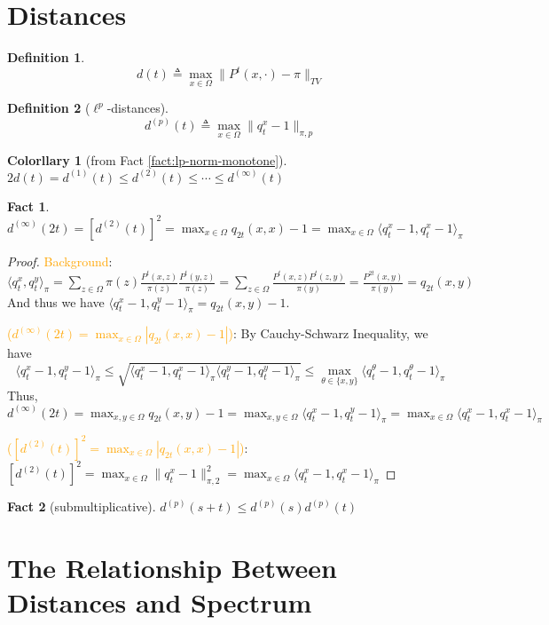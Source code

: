 \documentclass[utf8]{article}
\newtheorem{define}{Definition}[section]
\newtheorem{fact}{Fact}[section]
\newtheorem{corollary}{Colorllary}[section]
\def\<{\langle}
\def\>{\rangle}
\begin{document}
\section{Distances}
\begin{define}
  \[d(t) \triangleq \max_{x\in\Omega} \parallel P^t(x, \cdot) - \pi \parallel_{TV}\]
\end{define}
\begin{define}[$\ell^p$-distances]
  \[d^{(p)}(t) \triangleq \max_{x\in\Omega} \parallel q_t^x - 1 \parallel_{\pi, p}\]
\end{define}
\begin{corollary}[from Fact \ref{fact:lp-norm-monotone}]
  $2d(t) = d^{(1)}(t) \leq d^{(2)}(t) \leq \cdots \leq d^{(\infty)}(t)$
\end{corollary}
\begin{fact}
  $d^{(\infty)}(2t) = \left[d^{(2)}(t)\right]^2 = \max_{x\in\Omega} q_{2t}(x, x) - 1 = \max_{x\in\Omega}\<q_t^x - 1, q_t^x - 1\>_\pi$
\end{fact}
\begin{proof}
  \textcolor{orange}{Background}: 
  $\<q_t^x, q_t^y\>_\pi = \sum_{z\in\Omega} \pi(z) \frac{P^t(x, z)}{\pi(z)} \frac{P^t(y, z)}{\pi(z)}
  = \sum_{z\in\Omega} \frac{P^t(x, z)P^t(z, y)}{\pi(y)}
  = \frac{P^{2t}(x, y)}{\pi(y)} = q_{2t}(x,y)$
  And thus we have $\<q_t^x - 1, q_t^y - 1\>_\pi = q_{2t}(x, y) - 1$.
  
  \textcolor{orange}{($d^{(\infty)}(2t) = \max_{x\in\Omega} |q_{2t}(x, x) - 1|$)}:
  By Cauchy-Schwarz Inequality, we have
  \[\<q_t^x - 1, q_t^y - 1\>_\pi\leq\sqrt{\<q_t^x - 1, q_t^x - 1\>_\pi\<q_t^y - 1, q_t^y - 1\>_\pi} \leq \max_{\theta\in\{x,y\}} \<q_t^\theta - 1, q_t^\theta - 1\>_\pi\]
  Thus, $d^{(\infty)}(2t) = \max_{x, y\in \Omega} q_{2t}(x, y) - 1 = \max_{x, y\in\Omega}\<q_t^x - 1, q_t^y - 1\>_\pi = \max_{x\in\Omega}\<q_t^x - 1, q_t^x - 1\>_\pi$

  \textcolor{orange}{($\left[d^{(2)}(t)\right]^2 = \max_{x\in\Omega} |q_{2t}(x, x) - 1|$)}:
  $[d^{(2)}(t)]^2 = \max_{x\in\Omega}\parallel q_t^x - 1 \parallel_{\pi, 2}^2 = \max_{x\in\Omega}\<q_t^x - 1, q_t^x - 1\>_\pi$
\end{proof}

\begin{fact}[submultiplicative]
  $d^{(p)}(s+t) \leq d^{(p)}(s)d^{(p)}(t)$
\end{fact}

\section{The Relationship Between Distances and Spectrum}
\end{document}
